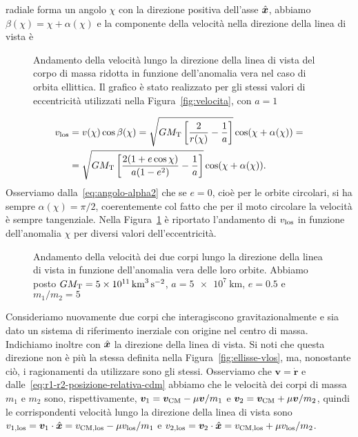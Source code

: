 {radiale forma un angolo $\chi$ con la direzione positiva dell'asse
$\hat{\bm{x}}$, abbiamo $\beta(\chi) = \chi + \alpha(\chi)$ e la componente
della velocità nella direzione della linea di vista è
\begin{figure}[tb]
  \centering
  
  \caption[Andamento della velocità nella direzione della linea di vista in
  funzione dell'anomalia
  vera]{Andamento della velocità lungo la direzione della linea di vista del
    corpo di massa ridotta in funzione dell'anomalia vera nel caso di orbita
    ellittica. Il grafico è stato realizzato per gli stessi valori di
    eccentricità utilizzati nella Figura~\ref{fig:velocita}, con $a=1$}
  \label{fig:velocita-los}
\end{figure}
\begin{equation}
  \begin{split}
    v_\textup{los} &= v(\chi)\cos\beta(\chi) = \sqrt{GM_\textup{T} \left[
      \frac{2}{r(\chi)} - \frac{1}{a}
    \right]}\cos(\chi + \alpha(\chi)) = \\
    &= \sqrt{GM_\textup{T}
    \left[
      \frac{2(1+e\cos\chi)}{a(1-e^2)} - \frac{1}{a}
    \right]}\cos(\chi + \alpha(\chi)).
  \end{split}
\end{equation}
Osserviamo dalla~\eqref{eq:angolo-alpha2} che se $e=0$, cioè per le orbite
circolari, si ha sempre $\alpha(\chi) = \pi/2$, coerentemente col fatto che
per il moto circolare la velocità è sempre tangenziale. Nella
Figura~\ref{fig:velocita-los} è riportato l'andamento di $v_\textup{los}$ in
funzione dell'anomalia $\chi$ per diversi valori dell'eccentricità.

\begin{figure}
  \centering
  
  \caption[Andamento della velocità dei due corpi nella direzione della linea di
  vista in funzione dell'anomalia
  vera]{Andamento della velocità dei due corpi lungo la direzione della linea di
    vista in funzione dell'anomalia vera delle loro orbite. Abbiamo posto
    $GM_\textup{T} = \SI{5e11}{\cubic\kilo\metre\per\square\second}$,
    $a = \SI{5e7}{\kilo\metre}$, $e=0.5$ e $m_1/m_2=5$}
  \label{fig:velocita-los-due-corpi}
\end{figure}
Consideriamo nuovamente due corpi che interagiscono gravitazionalmente e sia
dato un sistema di riferimento inerziale con origine nel centro di
massa. Indichiamo inoltre con $\hat{\bm{x}}$ la direzione della linea di vista. Si
noti che questa direzione non è più la stessa definita nella
Figura~\ref{fig:ellisse-vlos}, ma, nonostante ciò, i ragionamenti da utilizzare
sono gli stessi. Osserviamo che $\bm{v}=\dot{\bm{r}}$ e
dalle~\eqref{eq:r1-r2-posizione-relativa-cdm} abbiamo che le velocità dei corpi
di massa $m_1$ e $m_2$ sono, rispettivamente,
$\bm{v}_1 = \bm{v}_\textup{CM}-\mu\bm{v}/m_1$ e
$\bm{v}_2 = \bm{v}_\textup{CM} + \mu\bm{v}/m_2$, quindi le corrispondenti
velocità lungo la direzione della linea di vista sono
$v_{1,\textup{los}} = \bm{v}_1 \cdot \hat{\bm{x}} = v_\textup{CM,los}-\mu
v_\textup{los}/m_1$
e
$v_{2,\textup{los}} = \bm{v}_2 \cdot \hat{\bm{x}} = v_\textup{CM,los} + \mu
v_\textup{los}/m_2$.

}
